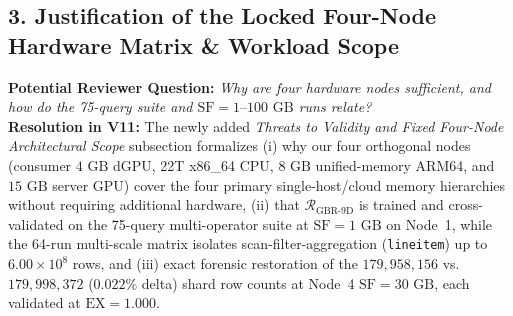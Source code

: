 \documentclass[11pt,a4paper]{article}
\begin{document}
\subsection*{3. Justification of the Locked Four-Node Hardware Matrix \& Workload Scope}
\textbf{Potential Reviewer Question:} \emph{Why are four hardware nodes sufficient, and how do the 75-query suite and $\text{SF}=1\text{--}100\text{ GB}$ runs relate?}\\
\textbf{Resolution in V11:} The newly added \emph{Threats to Validity and Fixed Four-Node Architectural Scope} subsection formalizes (i) why our four orthogonal nodes (consumer $4\text{ GB}$ dGPU, 22T x86\_64 CPU, $8\text{ GB}$ unified-memory ARM64, and $15\text{ GB}$ server GPU) cover the four primary single-host/cloud memory hierarchies without requiring additional hardware, (ii) that $\mathcal{R}_{\text{GBR-9D}}$ is trained and cross-validated on the 75-query multi-operator suite at $\text{SF}=1\text{ GB}$ on Node~1, while the 64-run multi-scale matrix isolates scan-filter-aggregation (\texttt{lineitem}) up to $6.00\times 10^{8}$ rows, and (iii) exact forensic restoration of the $179{,}958{,}156$ vs.\ $179{,}998{,}372$ ($0.022\%$ delta) shard row counts at Node~4 $\text{SF}=30\text{ GB}$, each validated at $\text{EX}=1.000$.
\end{document}
